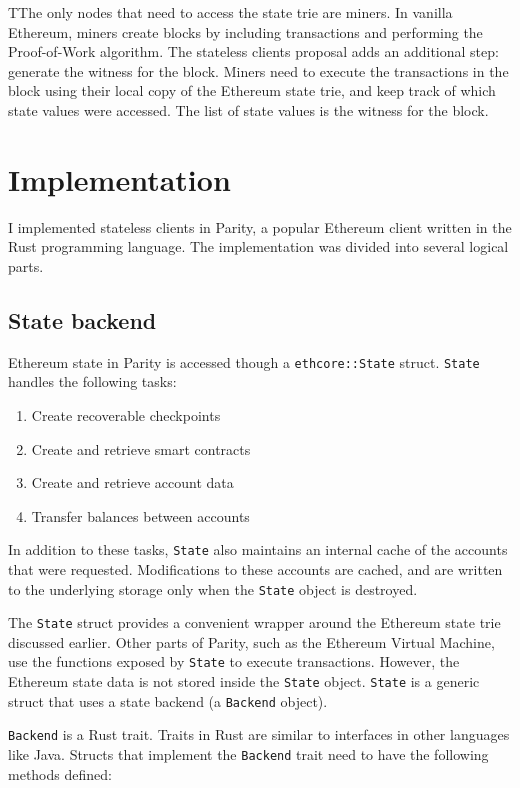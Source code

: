 \documentclass[12pt]{article}
\begin{document}
TThe only nodes that need to access the state trie are miners. In vanilla Ethereum, miners create blocks by including transactions and performing the Proof-of-Work algorithm. The stateless clients proposal adds an additional step: generate the witness for the block. Miners need to execute the transactions in the block using their local copy of the Ethereum state trie, and keep track of which state values were accessed. The list of state values is the witness for the block.


\section{Implementation}

I implemented stateless clients in Parity, a popular Ethereum client written in the Rust programming language. The implementation was divided into several logical parts.

\subsection{State backend}

Ethereum state in Parity is accessed though a \texttt{ethcore::State} struct. \texttt{State} handles the following tasks:
\begin{enumerate}
  \item Create recoverable checkpoints
  \item Create and retrieve smart contracts
  \item Create and retrieve account data
  \item Transfer balances between accounts
\end{enumerate}

In addition to these tasks, \texttt{State} also maintains an internal cache of the accounts that were requested. Modifications to these accounts are cached, and are written to the underlying storage only when the \texttt{State} object is destroyed.

The \texttt{State} struct provides a convenient wrapper around the Ethereum state trie discussed earlier. Other parts of Parity, such as the Ethereum Virtual Machine, use the functions exposed by \texttt{State} to execute transactions. However, the Ethereum state data is not stored inside the \texttt{State} object. \texttt{State} is a generic struct that uses a state backend (a \texttt{Backend} object).

\texttt{Backend} is a Rust trait. Traits in Rust are similar to interfaces in other languages like Java. Structs that implement the \texttt{Backend} trait need to have the following methods defined:
\end{document}
